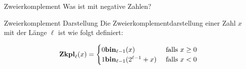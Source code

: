 

\newcommand{\definitionOfZkpl}{
\begin{align*}
\fZkpl_{\ell}(x) =
\begin{cases}
0 \fbin_{\ell-1}(x) & \text{ falls } x\geq 0 \\
1 \fbin_{\ell-1}(2^{\ell-1} + x) & \text{ falls } x< 0 
\end{cases}
\end{align*}
}

\begin{frame}{Zweierkomplement}
	\p Was ist mit negative Zahlen?
	
	\pause 
	
	\begin{block}{Zweierkomplement Darstellung}
		Die Zweierkomplementdarstellung einer Zahl $x$ \p mit der Länge $\ell$ ist wie folgt definiert:\p
		\definitionOfZkpl		
	\end{block}
\end{frame}


